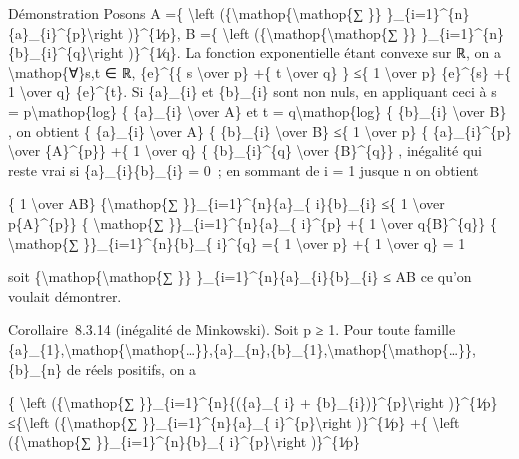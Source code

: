 \documentclass[]{article}
\begin{document}
Démonstration Posons A =\{ \textbackslash{}left
(\{\textbackslash{}mathop\{\textbackslash{}mathop\{∑ \}\}
\}\_\{i=1\}\^{}\{n\}\{a\}\_\{i\}\^{}\{p\}\textbackslash{}right
)\}\^{}\{1∕p\}, B =\{ \textbackslash{}left
(\{\textbackslash{}mathop\{\textbackslash{}mathop\{∑ \}\}
\}\_\{i=1\}\^{}\{n\}\{b\}\_\{i\}\^{}\{q\}\textbackslash{}right
)\}\^{}\{1∕q\}. La fonction exponentielle étant convexe sur ℝ, on a
\textbackslash{}mathop\{∀\}s,t ∈ ℝ, \{e\}\^{}\{\{ s \textbackslash{}over
p\} +\{ t \textbackslash{}over q\} \} ≤\{ 1 \textbackslash{}over p\}
\{e\}\^{}\{s\} +\{ 1 \textbackslash{}over q\} \{e\}\^{}\{t\}. Si
\{a\}\_\{i\} et \{b\}\_\{i\} sont non nuls, en appliquant ceci à s =
p\textbackslash{}mathop\{log\} \{ \{a\}\_\{i\} \textbackslash{}over A\}
et t = q\textbackslash{}mathop\{log\} \{ \{b\}\_\{i\}
\textbackslash{}over B\} , on obtient \{ \{a\}\_\{i\}
\textbackslash{}over A\} \{ \{b\}\_\{i\} \textbackslash{}over B\} ≤\{ 1
\textbackslash{}over p\} \{ \{a\}\_\{i\}\^{}\{p\} \textbackslash{}over
\{A\}\^{}\{p\}\} +\{ 1 \textbackslash{}over q\} \{ \{b\}\_\{i\}\^{}\{q\}
\textbackslash{}over \{B\}\^{}\{q\}\} , inégalité qui reste vrai si
\{a\}\_\{i\}\{b\}\_\{i\} = 0~; en sommant de i = 1 jusque n on obtient

\{ 1 \textbackslash{}over AB\} \{\textbackslash{}mathop\{∑
\}\}\_\{i=1\}\^{}\{n\}\{a\}\_\{ i\}\{b\}\_\{i\} ≤\{ 1
\textbackslash{}over p\{A\}\^{}\{p\}\} \{ \textbackslash{}mathop\{∑
\}\}\_\{i=1\}\^{}\{n\}\{a\}\_\{ i\}\^{}\{p\} +\{ 1 \textbackslash{}over
q\{B\}\^{}\{q\}\} \{ \textbackslash{}mathop\{∑
\}\}\_\{i=1\}\^{}\{n\}\{b\}\_\{ i\}\^{}\{q\} =\{ 1 \textbackslash{}over
p\} +\{ 1 \textbackslash{}over q\} = 1

soit \{\textbackslash{}mathop\{\textbackslash{}mathop\{∑ \}\}
\}\_\{i=1\}\^{}\{n\}\{a\}\_\{i\}\{b\}\_\{i\} ≤ AB ce qu'on voulait
démontrer.

Corollaire~8.3.14 (inégalité de Minkowski). Soit p ≥ 1. Pour toute
famille
\{a\}\_\{1\},\textbackslash{}mathop\{\textbackslash{}mathop\{\ldots{}\}\},\{a\}\_\{n\},\{b\}\_\{1\},\textbackslash{}mathop\{\textbackslash{}mathop\{\ldots{}\}\},\{b\}\_\{n\}
de réels positifs, on a

\{ \textbackslash{}left (\{\textbackslash{}mathop\{∑
\}\}\_\{i=1\}\^{}\{n\}\{(\{a\}\_\{ i\} +
\{b\}\_\{i\})\}\^{}\{p\}\textbackslash{}right )\}\^{}\{1∕p\}
≤\{\textbackslash{}left (\{\textbackslash{}mathop\{∑
\}\}\_\{i=1\}\^{}\{n\}\{a\}\_\{ i\}\^{}\{p\}\textbackslash{}right
)\}\^{}\{1∕p\} +\{ \textbackslash{}left (\{\textbackslash{}mathop\{∑
\}\}\_\{i=1\}\^{}\{n\}\{b\}\_\{ i\}\^{}\{p\}\textbackslash{}right
)\}\^{}\{1∕p\}
\end{document}
